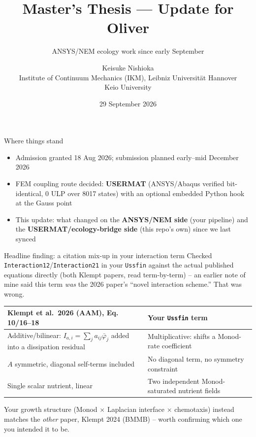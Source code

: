 \documentclass[aspectratio=169,11pt]{beamer}
\title{Master's Thesis --- Update for Oliver}
\subtitle{ANSYS/NEM ecology work since early September}
\author{Keisuke Nishioka\\[4pt]
\small Institute of Continuum Mechanics (IKM), Leibniz Universit\"at Hannover\\
\small Keio University}
\date{29 September 2026}
\begin{document}
\maketitle

\begin{frame}{Where things stand}
\begin{itemize}
  \item Admission granted 18 Aug 2026; submission planned early--mid
        December 2026
  \item FEM coupling route decided: \textbf{USERMAT} (ANSYS/Abaqus verified
        bit-identical, 0 ULP over 8017 states) with an optional embedded
        Python hook at the Gauss point
  \item This update: what changed on the \textbf{ANSYS/NEM side} (your
        pipeline) and the \textbf{USERMAT/ecology-bridge side} (this
        repo's own) since we last synced
\end{itemize}
\end{frame}

\begin{frame}{Headline finding: a citation mix-up in your interaction term}
\small
Checked \texttt{Interaction12}/\texttt{Interaction21} in your
\texttt{Ussfin} against the actual published equations directly (both
Klempt papers, read term-by-term) -- an earlier note of mine said this
term \emph{was} the 2026 paper's ``novel interaction scheme.'' That
was wrong.
\vspace{4pt}
\begin{center}
\begin{tabular}{@{}p{5.3cm}p{5.3cm}@{}}
\toprule
\textbf{Klempt et al.\ 2026 (AAM)}, Eq.\,10/16--18 &
\textbf{Your \texttt{Ussfin} term}\\
\midrule
Additive/bilinear: $I_{a,i}=\sum_j a_{ij}\bar\varphi_j$ added into a
dissipation residual &
Multiplicative: shifts a Monod-rate coefficient\\
$A$ symmetric, diagonal self-terms included &
No diagonal term, no symmetry constraint\\
Single scalar nutrient, linear &
Two independent Monod-saturated nutrient fields\\
\bottomrule
\end{tabular}
\end{center}
\vspace{4pt}
Your growth structure (Monod $\times$ Laplacian interface $\times$
chemotaxis) instead matches the \emph{other} paper, Klempt 2024 (BMMB) --
worth confirming which one you intended it to be.
\end{frame}
\end{document}
